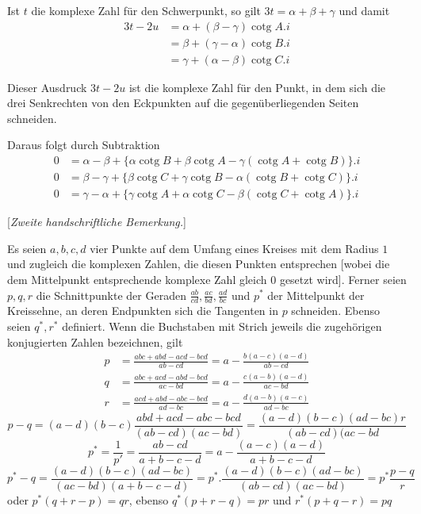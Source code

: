 %
\par
Ist \(t\) die komplexe Zahl für den Schwerpunkt, so gilt \(3t=\alpha+\beta+\gamma\) und damit
\[
\begin{aligned}
3t-2u&=\alpha+(\beta-\gamma)\operatorname{cotg}A.i\\
&=\beta+(\gamma-\alpha)\operatorname{cotg}B.i\\
&=\gamma+(\alpha-\beta)\operatorname{cotg}C.i
\end{aligned}
\]
\par
Dieser Ausdruck \(3t-2u\) ist die komplexe Zahl für den Punkt, in dem sich die drei Senkrechten von den Eckpunkten auf die gegenüberliegenden Seiten schneiden.

Daraus folgt durch Subtraktion
\[
\begin{aligned}
0&=\alpha-\beta+\{\alpha\operatorname{cotg}B+\beta\operatorname{cotg}A-\gamma(\operatorname{cotg}A+\operatorname{cotg}B)\}.i\\
0&=\beta-\gamma+\{\beta\operatorname{cotg}C+\gamma\operatorname{cotg}B-\alpha(\operatorname{cotg}B+\operatorname{cotg}C)\}.i\\
0&=\gamma-\alpha+\{\gamma\operatorname{cotg}A+\alpha\operatorname{cotg}C-\beta(\operatorname{cotg}C+\operatorname{cotg}A)\}.i
\end{aligned}
\]
\par\medskip{}
\begin{center}[\textit{Zweite handschriftliche Bemerkung.}]\end{center}
\hspace*{\parindent}Es seien \(a,b,c,d\) vier Punkte auf dem Umfang eines Kreises mit dem Radius \(1\) und zugleich die komplexen Zahlen, die diesen Punkten entsprechen [wobei die dem Mittelpunkt entsprechende komplexe Zahl gleich \(0\) gesetzt wird]. Ferner seien \(p,q,r\) die Schnittpunkte der Geraden \(\tfrac{ab}{cd},\tfrac{ac}{bd},\tfrac{ad}{bc}\) und \(p^*\) der Mittelpunkt der Kreissehne, an deren Endpunkten sich die Tangenten in \(p\) schneiden. Ebenso seien \(q^*,r^*\) definiert. Wenn die Buchstaben mit Strich jeweils die zugehörigen konjugierten Zahlen bezeichnen, gilt
\[
\begin{aligned}
p&=\frac{abc+abd-acd-bcd}{ab-cd}=a-\frac{b(a-c)(a-d)}{ab-cd}\\
q&=\frac{abc+acd-abd-bcd}{ac-bd}=a-\frac{c(a-b)(a-d)}{ac-bd}\\
r&=\frac{acd+abd-abc-bcd}{ad-bc}=a-\frac{d(a-b)(a-c)}{ad-bc}
\end{aligned}
\]
\[
p-q=(a-d)(b-c)\frac{abd+acd-abc-bcd}{(ab-cd)(ac-bd)}=\frac{(a-d)(b-c)(ad-bc)r}{(ab-cd)(ac-bd}
\]
\[
p^*=\frac1{p'}=\frac{ab-cd}{a+b-c-d}=a-\frac{(a-c)(a-d)}{a+b-c-d}
\]
\begingroup\footnotesize
\[
p^*-q=\frac{(a-d)(b-c)(ad-bc)}{(ac-bd)(a+b-c-d)}=p^*.\frac{(a-d)(b-c)(ad-bc)}{(ab-cd)(ac-bd)}=p^*\frac{p-q}{r}
\]
\endgroup
oder \(p^*(q+r-p)=qr\), ebenso \(q^*(p+r-q)=pr\) und \(r^*(p+q-r)=pq\)
